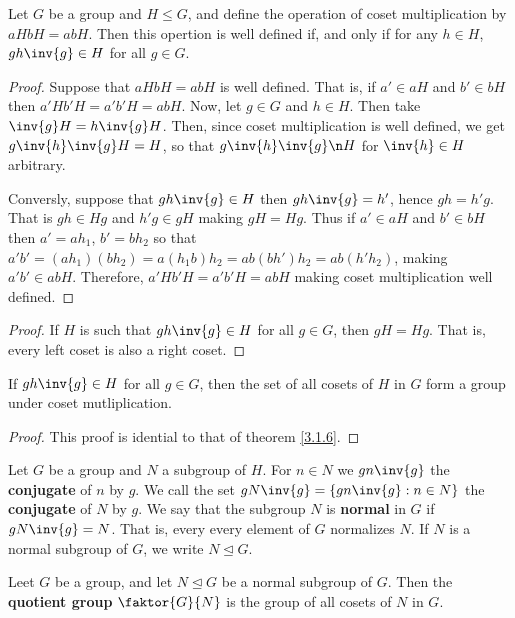 \begin{theorem}\label{3.2.3}
    Let $G$ be a group and  $H \leq G$, and define the operation of coset
    multiplication by  $aHbH=abH$. Then this opertion is well defined if, and
    only if for any  $h \in H$,  $gh\inv{g} \in H$ for all $g \in G$.
\end{theorem}
\begin{proof}
    Suppose that $aHbH=abH$ is well defined. That is, if  $a' \in aH$ and $b'
    \in bH$ then  $a'Hb'H=a'b'H=abH$. Now, let  $g \in G$ and  $h \in H$. Then
    take $\inv{g}H=h\inv{g}H$. Then, since coset multiplication is well defined,
    we get $g\inv{h}\inv{g}H=H$, so that $g\inv{h}\inv{g} \n H$ for $\inv{h} \in
    H$ arbitrary.

    Conversly, suppose that $gh\inv{g} \in H$ then $gh\inv{g}=h'$, hence
    $gh=h'g$. That is  $gh \in Hg$ and  $h'g \in gH$ making  $gH=Hg$. Thus if
    $a' \in aH$ and $b' \in bH$ then  $a'=ah_1$, $b'=bh_2$ so that
    $a'b'=(ah_1)(bh_2)=a(h_1b)h_2=ab(bh')h_2=ab(h'h_2)$, making $a'b' \in abH$.
    Therefore, $a'Hb'H=a'b'H=abH$ making coset multiplication well defined.
\end{proof}
\begin{proof}
    If $H$ is such that $gh\inv{g} \in H$ for all $g \in G$, then  $gH=Hg$. That
    is, every left coset is also a right coset.
\end{proof}
\begin{corollary}
    If $gh\inv{g} \in H$ for all $g \in G$, then the set of all cosets of  $H$
    in  $G$ form a group under coset mutliplication.
\end{corollary}
\begin{proof}
    This proof is idential to that of theorem \ref{3.1.6}.
\end{proof}

\begin{definition}
    Let $G$ be a group and $N$ a subgroup of  $H$. For  $n \in N$ we
    $gn\inv{g}$ the \textbf{conjugate} of $n$ by  $g$. We call the set
    $gN\inv{g}=\{gn\inv{g} : n \in N\}$ the \textbf{conjugate} of $N$ by $g$. We
    say that the subgroup $N$ is \textbf{normal} in $G$ if $gN\inv{g}=N$. That
    is, every every element of $G$ normalizes  $N$. If  $N$ is a normal subgroup
    of  $G$, we write  $N \unlhd G$.
\end{definition}

\begin{definition}
    Leet $G$ be a group, and let $N \unlhd G$ be a normal subgroup of $G$. Then
    the  \textbf{quotient group} $\faktor{G}{N}$ is the group of all cosets of
    $N$ in  $G$.
\end{definition}


